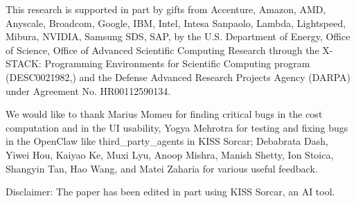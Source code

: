 \documentclass{article}
\begin{document}
This research is supported in part by gifts from Accenture, Amazon, AMD, Anyscale, Broadcom, Google, IBM, Intel, Intesa Sanpaolo, Lambda, Lightspeed, Mibura, NVIDIA, Samsung SDS, SAP, by the U.S. Department of Energy, Office of Science, Office of Advanced Scientific Computing Research through the X-STACK: Programming Environments for Scientific Computing program (DESC0021982,) and the Defense Advanced Research Projects Agency (DARPA) under Agreement No. HR00112590134.

We would like to thank Marius Momeu for finding critical bugs in the cost computation and in the UI usability, Yogya Mehrotra for testing and fixing bugs in the OpenClaw like third\_party\_agents in KISS Sorcar; Debabrata Dash, Yiwei Hou, Kaiyao Ke, Muxi Lyu, Anoop Mishra, Manish Shetty, Ion Stoica, Shangyin Tan, Hao Wang, and Matei Zaharia for various useful feedback.

Disclaimer: The paper has been edited in part using KISS Sorcar, an AI tool.



{ \small



}
\end{document}
